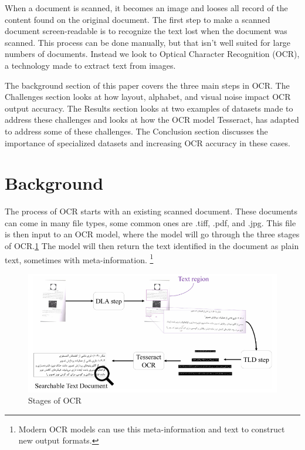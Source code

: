 \documentclass[sigplan,screen,nonacm]{acmart-tagged}
\begin{document}
When a document is scanned, it becomes an image and looses all record of the content found on the original document. The first step to make a scanned document screen-readable is to recognize the text lost when the document was scanned. This process can be done manually, but that isn't well suited for large numbers of documents. Instead we look to Optical Character Recognition (OCR), a technology made to extract text from images.

The background section of this paper covers the three main steps in OCR. The Challenges section looks at how layout, alphabet, and visual noise impact OCR output accuracy. The Results section looks at two examples of datasets made to address these challenges and looks at how the OCR model Tesseract, has adapted to address some of these challenges. The Conclusion section discusses the importance of specialized datasets and increasing OCR accuracy in these cases.

\section{Background}
\label{sec:background}
The process of OCR starts with an existing scanned document. These documents can come in many file types, some common ones are .tiff, .pdf, and .jpg.
This file is then input to an OCR model, where the model will go through the three stages of OCR.\ref{fig:stages} The model will then return the text identified in the document as plain text, sometimes with meta-information. \footnote{Modern OCR models can use this meta-information and text to construct new output formats.}

\begin{figure}
\centering
\includegraphics[width=\textwidth]{stages.png}
\caption{Stages of OCR}
\label{fig:stages}
\end{figure}
\end{document}
